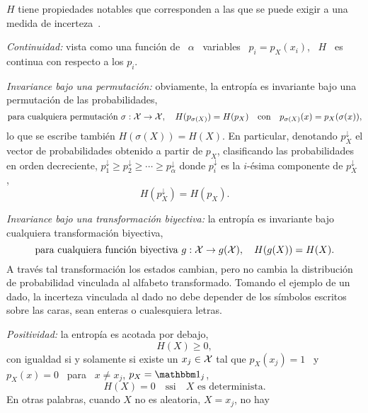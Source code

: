  $H$ tiene propiedades notables que corresponden
a  las que  se puede  exigir a  una medida  de  incerteza~\cite{Sha48, ShaWea64,
  CovTho06, Rio07, DemCov91, Joh04}.
%
\begin{propiedades}
\item\label{Prop:SZ:continuidad} {\it Continuidad:}  vista como una funci\'on de
  \ $\alpha$ \ variables  \ $p_i = p_X(x_i)$, \ $H$ \  es continua con respecto a
  los $p_i$.
%
\setcounter{PropPermutacion}{\value{enumi}}
\item\label{Prop:SZ:permutacion}   {\it  Invariance  bajo   una  permutaci\'on:}
  obviamente,  la  entrop\'ia  es  invariante  bajo  una  permutaci\'on  de  las
  probabilidades, \ie
  \[
  \mbox{para   cualquiera   permutaci\'on   }   \sigma:   \mathcal{X}   \to   \mathcal{X},   \quad
  H(p_{\sigma(X)})   =  H(p_X)   \quad  \mbox{con}   \quad   p_{\sigma(X)}(x)  =
  p_X(\sigma(x)),
  \]
  lo que se  escribe tambi\'en $H(\sigma(X)) = H(X)$.   En particular, denotando
  $p_X^\downarrow$  el vector  de  probabilidades obtenido  a  partir de  $p_X$,
  clasificando  las  probabilidades en  orden  decreciente, $p_1^\downarrow  \ge
  p_2^\downarrow \ge  \cdots \ge p_\alpha^\downarrow$  donde $p_i^\downarrow$ es
  la     $i$-\'esima      componente     de     $p_X^\downarrow$     ,
  \[
  H(p_X^\downarrow) = H(p_X).
  \]
%
\setcounter{PropBiyeccion}{\value{enumi}}
\item\label{Prop:SZ:biyeccion}   {\it  Invariance   bajo   una  transformaci\'on
    biyectiva:}  la entrop\'ia  es invariante  bajo  cualquiera transformaci\'on
  biyectiva, \ie
  \[
  \mbox{para cualquiera  funci\'on biyectiva } g:  \mathcal{X} \to g(\mathcal{X}),  \quad H(g(X)) =
  H(X).
  \]
  A  trav\'es  tal transformaci\'on  los  estados  cambian,  pero no  cambia  la
  distribuci\'on de probabilidad vinculada al alfabeto transformado.  Tomando el
  ejemplo de  un dado, la  incerteza vinculada al  dado no debe depender  de los
  s\'imbolos escritos sobre las caras, sean enteras o cualesquiera letras.
%
\item\label{Prop:SZ:positividad} {\it Positividad:} la entrop\'ia es acotada por
  debajo,
  \[
  H(X) \ge 0,
  \]
  con igualdad si y solamente si existe un $x_j \in \mathcal{X}$ tal que $p_X(x_j) = 1$ \
  y \ $p_X(x) = 0$ \ para \ $x \ne x_j$, \ie $p_X = \un_j$,
  \[
  H(X)  =  0 \quad  \mbox{ssi}  \quad X  \mbox{  es  determinista.}
  \]
  En  otras  palabras, cuando  $X$  no  es aleatoria,  \ie  $X  =  x_j$, no  hay

\end{propiedades}
